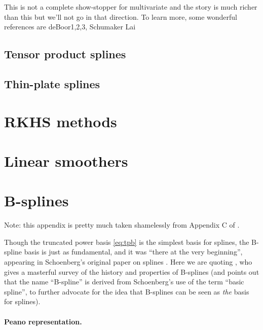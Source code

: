 \documentclass{article}
\begin{document}
This is not a complete show-stopper for multivariate and the story is much
richer than this but we'll not go in that direction. To learn more, some
wonderful references are deBoor1,2,3, Schumaker Lai

\subsection{Tensor product splines}

\subsection{Thin-plate splines}

\section{RKHS methods}

\section{Linear smoothers}




\clearpage
\appendix

\section{B-splines}
\label{app:bs}

Note: this appendix is pretty much taken shamelessly from Appendix C of 
\citet{tibshirani2022divided}.

Though the truncated power basis \eqref{eq:tpb} is the simplest basis for
splines, the B-spline basis is just as fundamental, and it was ``there at the 
very beginning'', appearing in Schoenberg's original paper on splines
\citep{schoenberg1946contributions1}. Here we are quoting
\citet{deboor1976splines}, who gives a masterful survey of the history and
properties of B-splines (and points out that the name ``B-spline'' is derived
from Schoenberg's use of the term ``basic spline'', to further advocate for the
idea that B-splines can be seen as \emph{the} basis for splines).

\paragraph{Peano representation.}

\def\st{^{\text{st}}}
\end{document}
